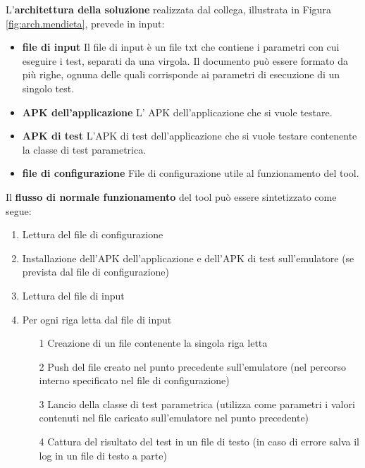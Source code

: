 \noindent L'\textbf{architettura della soluzione} realizzata dal collega, illustrata in Figura \ref{fig:arch.mendieta}, prevede in input:
\begin{itemize} [nosep]
\item \textbf{file di input} \newline
Il file di input è un file txt che contiene i  parametri con cui eseguire i test, separati da una virgola. Il documento può essere formato da più righe, ognuna delle quali corrisponde ai parametri di esecuzione di un singolo test.
\item   \textbf{APK dell'applicazione} \newline
L' APK dell'applicazione che si vuole testare.
\item  \textbf{APK di test} \newline
L'APK di test dell'applicazione che si vuole testare contenente la classe di test parametrica.
\item  \textbf{file di configurazione} \newline
File di configurazione utile al funzionamento del tool.
\end{itemize}
\bigskip
\noindent Il \textbf{flusso di normale funzionamento} del tool può essere sintetizzato come segue:
\begin{enumerate} [nosep]
\item Lettura del file di configurazione
\item Installazione dell'APK dell'applicazione e dell'APK di test sull'emulatore (se prevista dal file di configurazione)
\item Lettura del file di input
\item Per ogni riga letta dal file di input
\begin{itemize} [nosep]
\item [1] Creazione di un file contenente la singola riga letta
\item [2] Push del file creato nel punto precedente sull'emulatore (nel percorso interno specificato nel file di configurazione)
\item [3]  Lancio della classe di test parametrica (utilizza come parametri i valori contenuti nel file caricato sull'emulatore nel  punto precedente)
\item [4]  Cattura del risultato del test in un file di testo  (in caso di errore salva il log in un file di testo a parte)
\end{itemize}
\end{enumerate}

